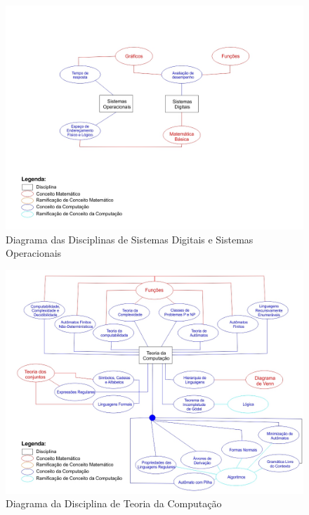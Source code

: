 \documentclass[12pt,a4paper]{article}
\begin{document}
\begin{figure}[!h]
	\centering
	\includegraphics[scale=0.5]{imagens/SD.jpg} 
	\caption{Diagrama das Disciplinas de Sistemas Digitais e Sistemas Operacionais}
\end{figure}

\begin{figure}[!h]
	\centering
	\includegraphics[scale=0.5]{imagens/TC.jpg} 
	\caption{Diagrama da Disciplina de Teoria da Computação}
\end{figure}
\end{document}
